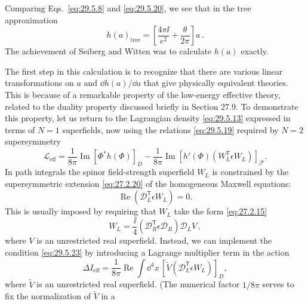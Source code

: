 Comparing Eqs.~\eqref{eq:29.5.8} and \eqref{eq:29.5.20}, we see that in the
tree approximation
\begin{equation}
  h(a)_{\mathrm{tree}}
  =\left[\frac{4\pi \ii}{e^2}+\frac{\theta}{2\pi}\right]a\,.
  \tag{29.5.21}\label{eq:29.5.21}
\end{equation}
The achievement of Seiberg and Witten was to calculate \(h(a)\) exactly.

The first step in this calculation is to recognize that there are various
linear transformations on \(a\) and \(\dd h(a)/\dd a\) that give physically
equivalent theories. This is because of a remarkable property of the
low-energy effective theory, related to the duality property discussed
briefly in Section 27.9. To demonstrate this property, let us return to the
Lagrangian density \eqref{eq:29.5.13} expressed in terms of \(N=1\)
superfields, now using the relations \eqref{eq:29.5.19} required by \(N=2\)
supersymmetry
\begin{equation}
  \mathcal{L}_{\mathrm{eff}}
  =\frac{1}{8\pi}\operatorname{Im}\left[\Phi^*h(\Phi)\right]_D
  -\frac{1}{8\pi}\operatorname{Im}
    \left[h'(\Phi)\left(W_L^{\mathsf T}\epsilon W_L\right)\right]_{\mathcal F}.
  \tag{29.5.22}\label{eq:29.5.22}
\end{equation}
In path integrals the spinor field-strength superfield \(W_L\) is constrained
by the supersymmetric extension \eqref{eq:27.2.20} of the homogeneous Maxwell
equations:
\begin{equation}
  \operatorname{Re}\left(\mathcal{D}_L^{\mathsf T}\epsilon W_L\right)=0.
  \tag{29.5.23}\label{eq:29.5.23}
\end{equation}
This is usually imposed by requiring that \(W_L\) take the form
\eqref{eq:27.2.15}
\begin{equation}
  W_L=\frac{\ii}{4}
  \left(\mathcal{D}_R^{\mathsf T}\epsilon\mathcal{D}_R\right)
  \mathcal{D}_LV\,,
  \tag{29.5.24}\label{eq:29.5.24}
\end{equation}
where \(V\) is an unrestricted real superfield. Instead, we can implement
the condition \eqref{eq:29.5.23} by introducing a Lagrange multiplier term
in the action
\begin{equation}
  \Delta I_{\mathrm{eff}}
  =\frac{1}{8\pi}\operatorname{Re}\int \dd^4x\,
    \left[
      \widetilde V
      \left(\mathcal{D}_L^{\mathsf T}\epsilon W_L\right)
    \right]_D,
  \tag{29.5.25}\label{eq:29.5.25}
\end{equation}
where \(\widetilde V\) is an unrestricted real superfield. (The numerical
factor \(1/8\pi\) serves to fix the normalization of \(\widetilde V\) in a
